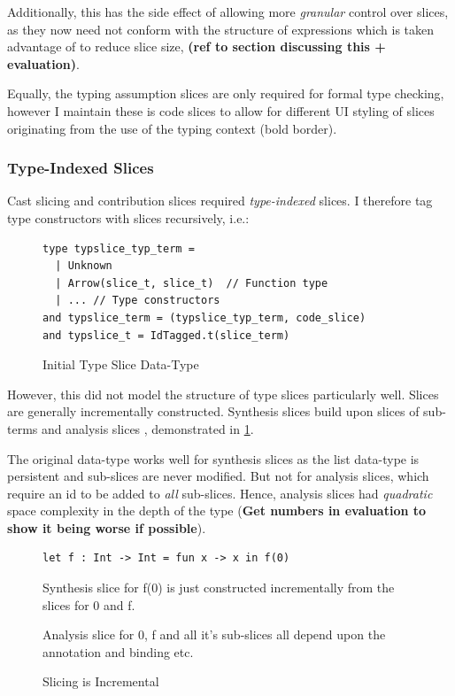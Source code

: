  Additionally, this has the side effect of allowing more \textit{granular} control over slices, as they now need not conform with the structure of expressions which is taken advantage of to reduce slice size, \textbf{(ref to section discussing this + evaluation)}.

Equally, the typing assumption slices are only required for formal type checking, however I maintain these is code slices to allow for different UI styling of slices originating from the use of the typing context (bold border).

\subsubsection{Type-Indexed Slices}
Cast slicing and contribution slices required \textit{type-indexed} slices. I therefore tag type constructors with slices recursively, i.e.:

\begin{figure}[h]
\begin{verbatim}
type typslice_typ_term = 
  | Unknown
  | Arrow(slice_t, slice_t)  // Function type
  | ... // Type constructors
and typslice_term = (typslice_typ_term, code_slice)
and typslice_t = IdTagged.t(slice_term)
\end{verbatim}
\caption{Initial Type Slice Data-Type}
\end{figure}

However, this did not model the structure of type slices particularly well. Slices are generally incrementally constructed. Synthesis slices build upon slices of sub-terms and analysis slices , demonstrated in \cref{fig:IncrementalSlices}. 

The original data-type works well for synthesis slices as the list data-type is persistent and sub-slices are never modified. But not for analysis slices, which require an id to be added to \textit{all} sub-slices. Hence, analysis slices had \textit{quadratic} space complexity in the depth of the type (\textbf{Get numbers in evaluation to show it being worse if possible}).

\begin{figure}[h]
\begin{verbatim}
let f : Int -> Int = fun x -> x in f(0)
\end{verbatim}
Synthesis slice for f(0) is just constructed incrementally from the slices for 0 and f. 

Analysis slice for 0, f and all it's sub-slices all depend upon the annotation and binding etc.
\caption{Slicing is Incremental}
\label{fig:IncrementalSlices}
\end{figure}



